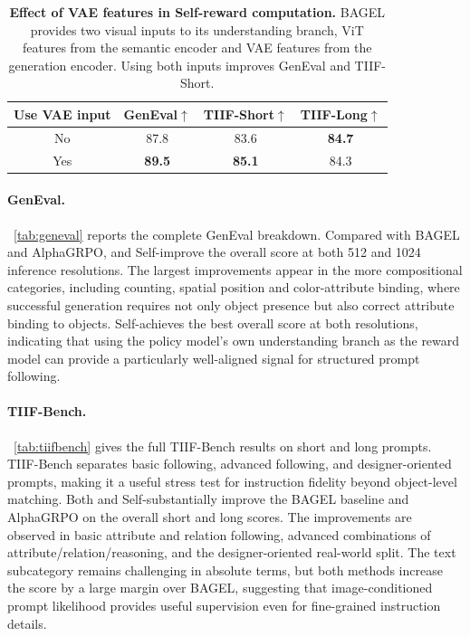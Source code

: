 \begin{table}[t]
    \scriptsize
    \centering
    \caption{\textbf{Effect of VAE features in Self-\method reward computation.}
        BAGEL provides two visual inputs to its understanding branch, 
        ViT features from the semantic encoder and VAE features from the generation encoder. 
        Using both inputs improves GenEval and TIIF-Short.
    }
    \label{tab:vae}
    \begin{tabular}{cccc}
    \toprule
    \textbf{Use VAE input} & \textbf{GenEval$\uparrow$} & \textbf{TIIF-Short$\uparrow$} & \textbf{TIIF-Long$\uparrow$} \\
    \midrule
    No             & 87.8 & 83.6 & \textbf{84.7}  \\
    \rowcolor{gray!10}
    Yes           & \textbf{89.5} & \textbf{85.1} & {84.3} \\
    \bottomrule
    \end{tabular}
\end{table}

\paragraph{GenEval.}~\autoref{tab:geneval} reports the complete GenEval breakdown. 
Compared with BAGEL and AlphaGRPO, \method and Self-\method improve the overall score at both 512 and 1024 inference resolutions. 
The largest improvements appear in the more compositional categories, including counting, spatial position and color-attribute binding, 
where successful generation requires not only object presence but also correct attribute binding to objects.
Self-\method achieves the best overall score at both resolutions, indicating that using the policy model's own understanding branch 
as the reward model can provide a particularly well-aligned signal for structured prompt following.


\paragraph{TIIF-Bench.}~\autoref{tab:tiifbench} gives the full TIIF-Bench results on short and long prompts. 
TIIF-Bench separates basic following, advanced following, and designer-oriented prompts, 
making it a useful stress test for instruction fidelity beyond object-level matching.
Both \method and Self-\method substantially improve the BAGEL baseline and AlphaGRPO on the overall short and long scores. 
The improvements are observed in basic attribute and relation following, advanced combinations
of attribute/relation/reasoning, and the designer-oriented real-world split.
The text subcategory remains challenging in absolute terms, 
but both methods increase the score by a large margin over BAGEL, 
suggesting that image-conditioned prompt likelihood provides useful supervision even for
fine-grained instruction details.


